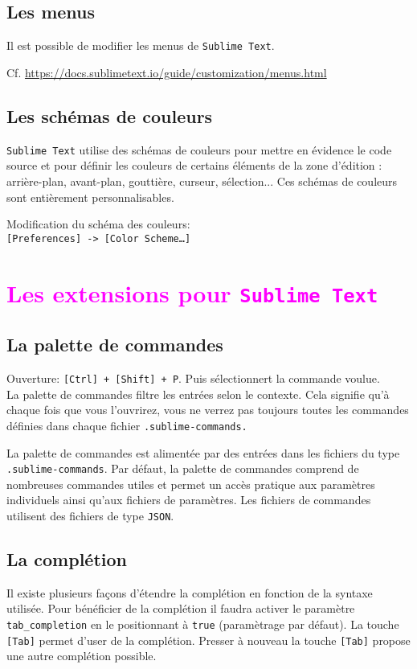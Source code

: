 \documentclass[french,a4paper]{article}
\begin{document}
\subsection*{Les menus}
Il est possible de modifier les menus de \texttt{Sublime Text}.

Cf. \url{https://docs.sublimetext.io/guide/customization/menus.html}
\bigskip

\subsection*{Les schémas de couleurs}

\texttt{Sublime Text} utilise des schémas de couleurs pour mettre en évidence
 le code source et pour définir les couleurs de certains éléments de la zone 
 d'édition : arrière-plan, avant-plan, gouttière, curseur, sélection... Ces 
 schémas de couleurs sont entièrement personnalisables.
 \medskip

 Modification du schéma des couleurs: \\
 \texttt{[Preferences] -> [Color Scheme\dots]}
\bigskip

\section{\textcolor{magenta}{Les extensions pour \texttt{Sublime Text}}}
\subsection*{La palette de commandes}
Ouverture: \texttt{[Ctrl] + [Shift] + P}. Puis sélectionnert la commande 
 voulue. \\
La palette de commandes filtre les entrées selon le contexte. Cela signifie
 qu'à chaque fois que vous l'ouvrirez, vous ne verrez pas toujours toutes les
 commandes définies dans chaque fichier \texttt{.sublime-commands.}
\medskip

La palette de commandes est alimentée par des entrées dans les fichiers du 
 type \texttt{.sublime-commands}. Par défaut, la palette de commandes comprend
 de nombreuses commandes utiles et permet un accès pratique aux paramètres 
 individuels ainsi qu'aux fichiers de paramètres. Les fichiers de commandes 
 utilisent des fichiers de type \texttt{JSON}.
\bigskip

\subsection*{La complétion}
Il existe plusieurs façons d'étendre la complétion en fonction de la syntaxe
utilisée. Pour bénéficier de la complétion il faudra activer le paramètre 
\texttt{tab\_completion} en le positionnant à \texttt{true} (paramètrage par
défaut). La touche \texttt{[Tab]} permet d'user de la complétion. Presser à
nouveau la touche \texttt{[Tab]} propose une autre complétion possible.
\bigskip
\end{document}
